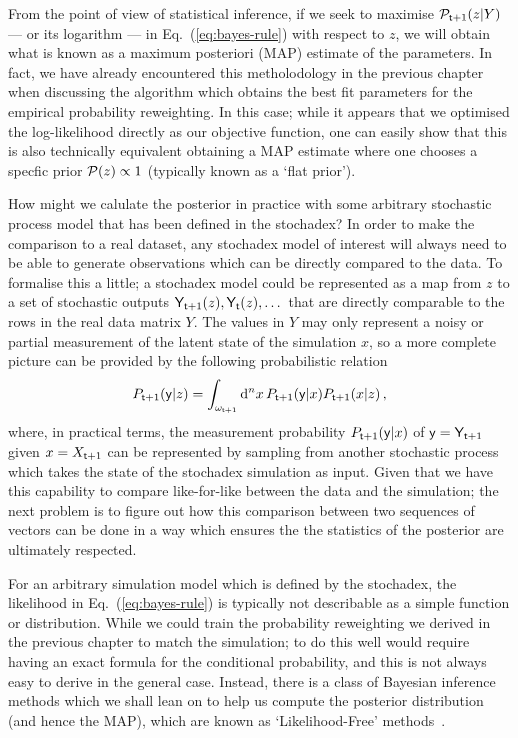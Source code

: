 From the point of view of statistical inference, if we seek to maximise ${\cal P}_{{\sf t}+1}(z \vert Y)$ --- or its logarithm --- in Eq.~(\ref{eq:bayes-rule}) with respect to $z$, we will obtain what is known as a maximum posteriori (MAP) estimate of the parameters. In fact, we have already encountered this metholodology in the previous chapter when discussing the algorithm which obtains the best fit parameters for the empirical probability reweighting. In this case; while it appears that we optimised the log-likelihood directly as our objective function, one can easily show that this is also technically equivalent obtaining a MAP estimate where one chooses a specfic prior ${\cal P} (z) \propto 1$ (typically known as a `flat prior').

How might we calulate the posterior in practice with some arbitrary stochastic process model that has been defined in the stochadex? In order to make the comparison to a real dataset, any stochadex model of interest will always need to be able to generate observations which can be directly compared to the data. To formalise this a little; a stochadex model could be represented as a map from $z$ to a set of stochastic outputs ${\sf Y}_{{\sf t}+1}(z), {\sf Y}_{{\sf t}}(z), \dots$ that are directly comparable to the rows in the real data matrix $Y$. The values in $Y$ may only represent a noisy or partial measurement of the latent state of the simulation $x$, so a more complete picture can be provided by the following probabilistic relation
\begin{align}
P_{{\sf t}+1}({\sf y} \vert z) = \int_{\omega_{{\sf t}+1}}{\rm d}^nx\, P_{{\sf t}+1}({\sf y} \vert x)P_{{\sf t}+1}(x\vert z) \label{eq:simulation-measurement} \,,
\end{align}
where, in practical terms, the measurement probability $P_{{\sf t}+1}({\sf y} \vert x)$ of ${\sf y}={\sf Y}_{{\sf t}+1}$ given $x=X_{{\sf t}+1}$ can be represented by sampling from another stochastic process which takes the state of the stochadex simulation as input. Given that we have this capability to compare like-for-like between the data and the simulation; the next problem is to figure out how this comparison between two sequences of vectors can be done in a way which ensures the the statistics of the posterior are ultimately respected. 

For an arbitrary simulation model which is defined by the stochadex, the likelihood in Eq.~(\ref{eq:bayes-rule}) is typically not describable as a simple function or distribution. While we could train the probability reweighting we derived in the previous chapter to match the simulation; to do this well would require having an exact formula for the conditional probability, and this is not always easy to derive in the general case. Instead, there is a class of Bayesian inference methods which we shall lean on to help us compute the posterior distribution (and hence the MAP), which are known as `Likelihood-Free' methods~\cite{sisson2018handbook,price2018bayesian,wood2010statistical,drovandi2022comparison}.

